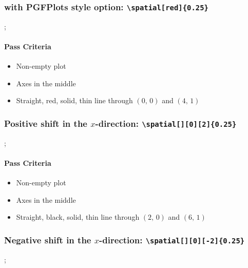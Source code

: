 \documentclass[pagesize,headsepline,parskip=half]{scrartcl}
\begin{document}
          \subsubsection{with PGFPlots style option: \texttt{\textbackslash{}spatial[red]\{0.25\}}}
            \begin{spacetimediagram}[grid, ymax=4]
              ;
            \end{spacetimediagram}

            \paragraph{Pass Criteria}
              \begin{itemize}
                \item Non-empty plot
                \item Axes in the middle
                \item Straight, red, solid, thin line through $(0, \, 0)$ and $(4, \, 1)$
              \end{itemize}

          \subsubsection{Positive shift in the $x$-direction: \texttt{\textbackslash{}spatial[][0][2]\{0.25\}}}
            \begin{spacetimediagram}[grid, xmax=8, ymax=2, domain=-2:8]
              ;
            \end{spacetimediagram}

            \paragraph{Pass Criteria}
              \begin{itemize}
                \item Non-empty plot
                \item Axes in the middle
                \item Straight, black, solid, thin line through $(2, \, 0)$ and $(6, \, 1)$
              \end{itemize}

          \subsubsection{Negative shift in the $x$-direction: \texttt{\textbackslash{}spatial[][0][-2]\{0.25\}}}
            \begin{spacetimediagram}[grid, ymin=-4, ymax=4]
              ;
            \end{spacetimediagram}
\end{document}
